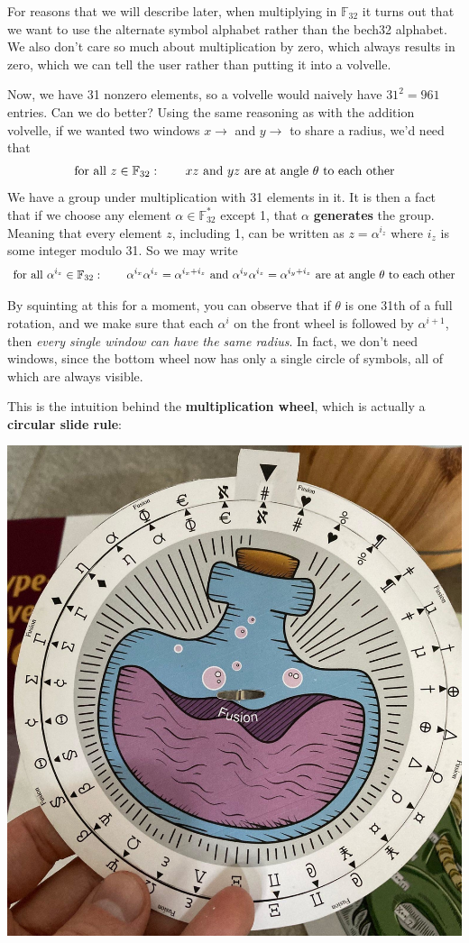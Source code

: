 \documentclass[letterpaper]{article}
\newcommand{\fttwo}{\mathbb{F}_{32}}
\begin{document}
For reasons that we will describe later, when multiplying in $\fttwo$ it turns
out that we want to use the alternate symbol alphabet rather than the bech32
alphabet. We also don't care so much about multiplication by zero, which always
results in zero, which we can tell the user rather than putting it into a
volvelle.

Now, we have 31 nonzero elements, so a volvelle would naively have $31^2=961$
entries. Can we do better? Using the same reasoning as with the addition volvelle,
if we wanted two windows $x\to$ and $y\to$ to share a radius, we'd need that
\[ \textnormal{for all } z\in\fttwo:\qquad xz \textnormal{ and } yz \textnormal{ are at angle $\theta$ to each other} \]
We have a group under multiplication with 31 elements in it. It is then a fact
that if we choose any element $\alpha\in\fttwo^*$ except 1, that $\alpha$
\textbf{generates} the group. Meaning that every element $z$, including 1,
can be written as $z=\alpha^{i_z}$ where $i_z$ is some integer modulo 31. So we
may write
\[ \textnormal{for all } \alpha^{i_z}\in\fttwo:\qquad \alpha^{i_x}\alpha^{i_z} = \alpha^{i_x+i_z} \textnormal{ and } \alpha^{i_y}\alpha^{i_z} = \alpha^{i_y+i_z} \textnormal{ are at angle $\theta$ to each other} \]

By squinting at this for a moment, you can observe that if $\theta$ is one 31th
of a full rotation, and we make sure that each $\alpha^i$ on the front wheel is
followed by $\alpha^{i+1}$, then \emph{every single window can have the same
radius}. In fact, we don't need windows, since the bottom wheel now has only a
single circle of symbols, all of which are always visible.

This is the intuition behind the \textbf{multiplication wheel}, which is actually
a \textbf{circular slide rule}:

\begin{center}\includegraphics[scale=1.00]{images/fusion-wheel.jpg}\end{center}
\end{document}
